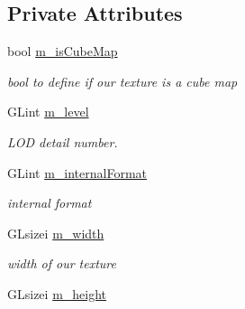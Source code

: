 \subsection*{Private Attributes}
\begin{DoxyCompactItemize}
\item 
\hypertarget{class_g_l_texture_afd2e590d7242b2ab54d0ac1473ada6cb}{bool \hyperlink{class_g_l_texture_afd2e590d7242b2ab54d0ac1473ada6cb}{m\-\_\-is\-Cube\-Map}}\label{class_g_l_texture_afd2e590d7242b2ab54d0ac1473ada6cb}

\begin{DoxyCompactList}\small\item\em bool to define if our texture is a cube map \end{DoxyCompactList}\item 
\hypertarget{class_g_l_texture_a7add2254b205660a18801f3e9df6d2b9}{G\-Lint \hyperlink{class_g_l_texture_a7add2254b205660a18801f3e9df6d2b9}{m\-\_\-level}}\label{class_g_l_texture_a7add2254b205660a18801f3e9df6d2b9}

\begin{DoxyCompactList}\small\item\em L\-O\-D detail number. \end{DoxyCompactList}\item 
\hypertarget{class_g_l_texture_a1298a4da5241c3f08188a91efdc820a3}{G\-Lint \hyperlink{class_g_l_texture_a1298a4da5241c3f08188a91efdc820a3}{m\-\_\-internal\-Format}}\label{class_g_l_texture_a1298a4da5241c3f08188a91efdc820a3}

\begin{DoxyCompactList}\small\item\em internal format \end{DoxyCompactList}\item 
\hypertarget{class_g_l_texture_ae2f00682c8694bd9ba1d348363f115f4}{G\-Lsizei \hyperlink{class_g_l_texture_ae2f00682c8694bd9ba1d348363f115f4}{m\-\_\-width}}\label{class_g_l_texture_ae2f00682c8694bd9ba1d348363f115f4}

\begin{DoxyCompactList}\small\item\em width of our texture \end{DoxyCompactList}\item 
\hypertarget{class_g_l_texture_a5148727b47ef344338fad34d8ae9c06c}{G\-Lsizei \hyperlink{class_g_l_texture_a5148727b47ef344338fad34d8ae9c06c}{m\-\_\-height}}\label{class_g_l_texture_a5148727b47ef344338fad34d8ae9c06c}


\end{DoxyCompactItemize}
